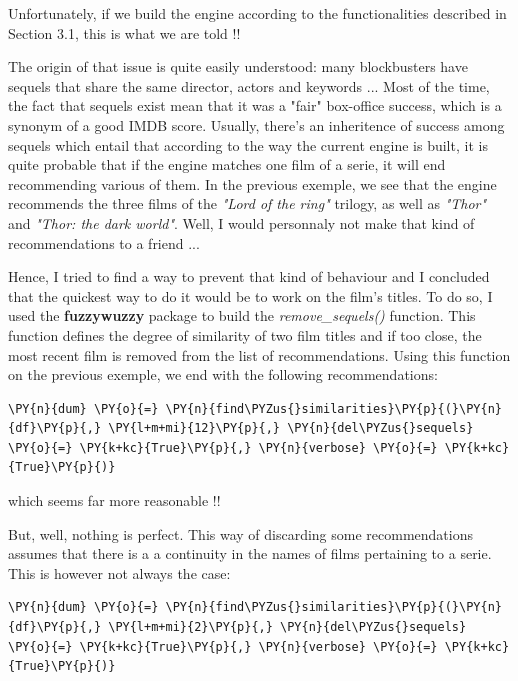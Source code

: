     Unfortunately, if we build the engine according to the functionalities
described in Section 3.1, this is what we are told !!

The origin of that issue is quite easily understood: many blockbusters
have sequels that share the same director, actors and keywords ... Most
of the time, the fact that sequels exist mean that it was a "fair"
box-office success, which is a synonym of a good IMDB score. Usually,
there's an inheritence of success among sequels which entail that
according to the way the current engine is built, it is quite probable
that if the engine matches one film of a serie, it will end recommending
various of them. In the previous exemple, we see that the engine
recommends the three films of the \emph{"Lord of the ring"} trilogy, as
well as \emph{"Thor"} and \emph{"Thor: the dark world"}. Well, I would
personnaly not make that kind of recommendations to a friend ...

Hence, I tried to find a way to prevent that kind of behaviour and I
concluded that the quickest way to do it would be to work on the film's
titles. To do so, I used the \textbf{fuzzywuzzy} package to build the
\emph{remove\_sequels()} function. This function defines the degree of
similarity of two film titles and if too close, the most recent film is
removed from the list of recommendations. Using this function on the
previous exemple, we end with the following recommendations:

    \begin{tcolorbox}[breakable, size=fbox, boxrule=1pt, pad at break*=1mm,colback=cellbackground, colframe=cellborder]
\begin{Verbatim}[commandchars=\\\{\}]
\PY{n}{dum} \PY{o}{=} \PY{n}{find\PYZus{}similarities}\PY{p}{(}\PY{n}{df}\PY{p}{,} \PY{l+m+mi}{12}\PY{p}{,} \PY{n}{del\PYZus{}sequels} \PY{o}{=} \PY{k+kc}{True}\PY{p}{,} \PY{n}{verbose} \PY{o}{=} \PY{k+kc}{True}\PY{p}{)}
\end{Verbatim}
\end{tcolorbox}

    which seems far more reasonable !!

But, well, nothing is perfect. This way of discarding some
recommendations assumes that there is a a continuity in the names of
films pertaining to a serie. This is however not always the case:

    \begin{tcolorbox}[breakable, size=fbox, boxrule=1pt, pad at break*=1mm,colback=cellbackground, colframe=cellborder]
\begin{Verbatim}[commandchars=\\\{\}]
\PY{n}{dum} \PY{o}{=} \PY{n}{find\PYZus{}similarities}\PY{p}{(}\PY{n}{df}\PY{p}{,} \PY{l+m+mi}{2}\PY{p}{,} \PY{n}{del\PYZus{}sequels} \PY{o}{=} \PY{k+kc}{True}\PY{p}{,} \PY{n}{verbose} \PY{o}{=} \PY{k+kc}{True}\PY{p}{)}
\end{Verbatim}
\end{tcolorbox}

